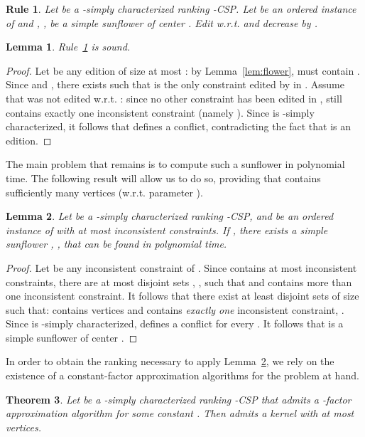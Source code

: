 \documentclass[11pt]{article}
\newtheorem{theorem}{Theorem}[section]
\newtheorem{lemma}[theorem]{Lemma}
\newtheorem{polyrule}{Rule}[section]
\begin{document}
\begin{polyrule}
\label{rule:correct}
	Let  be a -simply  characterized ranking -CSP. Let  be an ordered instance of  
	and , , be a simple sunflower of center . 
	Edit  w.r.t.  and decrease  by .
\end{polyrule}

\begin{lemma}
\label{lem:correct}
	Rule~\ref{rule:correct} is sound. 

\end{lemma}

\begin{proof}
	Let  be any edition of size at most : by Lemma~\ref{lem:flower},  must contain . Since  and , there exists  such that  is the only constraint edited by  in . Assume that  was not edited w.r.t. : since no other constraint has been edited in ,  still contains exactly one inconsistent constraint (namely ). Since  is -simply characterized, it follows that  defines a conflict, contradicting the fact that  is an edition.
 \end{proof}

The main problem that remains is to compute such a sunflower in polynomial time. The following result will allow us to do so, providing that  contains sufficiently many vertices (w.r.t. parameter ). 

\begin{lemma}
	\label{lem:correctSC}
	Let  be a -simply characterized ranking -CSP, and  be an ordered instance of  with at most  inconsistent constraints. If , there exists a simple sunflower , , that can be found in polynomial time.
\end{lemma}

\begin{proof}
	Let  be any inconsistent constraint of . Since  contains at 
	most  inconsistent constraints, there are at most  disjoint sets , , such that  and 
	 contains more than one inconsistent constraint. It follows that there exist at least  disjoint sets  of size  such that:   contains  vertices and   contains \emph{exactly one} inconsistent constraint, . Since  is -simply  characterized,   defines a conflict for every . It follows that  is a simple sunflower of center .\end{proof}

In order to obtain the ranking necessary to apply Lemma~\ref{lem:correctSC}, we rely on the existence of a constant-factor approximation algorithms for the problem at hand. 

\begin{theorem}
\label{thm:kernelSC}
	Let  be a -simply  characterized ranking -CSP that admits a -factor approximation algorithm for some constant . Then  admits a kernel with at most  vertices.
\end{theorem}
\end{document}
